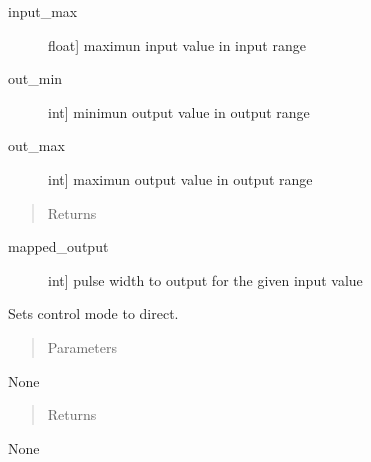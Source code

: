 \documentclass[letterpaper,10pt,english]{sphinxmanual}
\begin{document}
\begin{fulllineitems}
\begin{fulllineitems}
\begin{description}
\item[{input\_max}] \leavevmode{[}float{]}
\sphinxAtStartPar
maximun input value in input range

\item[{out\_min}] \leavevmode{[}int{]}
\sphinxAtStartPar
minimun output value in output range

\item[{out\_max}] \leavevmode{[}int{]}
\sphinxAtStartPar
maximun output value in output range

\end{description}
\begin{quote}\begin{description}
\item[{Returns}] \leavevmode
\end{description}\end{quote}
\begin{description}
\item[{mapped\_output}] \leavevmode{[}int{]}
\sphinxAtStartPar
pulse width to output for the given input value

\end{description}

\end{fulllineitems}


\begin{fulllineitems}
\label{\detokenize{generic:AnalogOutputObject.AnalogOutputObject.set_control_direct}}
\sphinxAtStartPar
Sets control mode to direct.
\begin{quote}\begin{description}
\item[{Parameters}] \leavevmode
\end{description}\end{quote}

\sphinxAtStartPar
None
\begin{quote}\begin{description}
\item[{Returns}] \leavevmode
\end{description}\end{quote}

\sphinxAtStartPar
None

\end{fulllineitems}


\end{fulllineitems}
\end{document}

